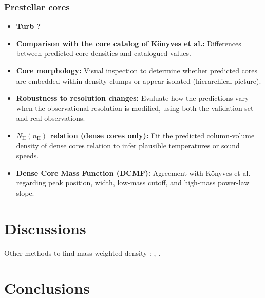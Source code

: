 \documentclass{aa}
\newcommand{\nh}{\ensuremath{n_\text{H}}}
\newcommand{\Nh}{\ensuremath{N_\text{H}}}
\begin{document}
   \subsubsection{Prestellar cores}

   
   

   \begin{itemize}
   \item \textbf{Turb ?}
   \item \textbf{Comparison with the core catalog of Könyves et al.:} Differences between predicted core densities and catalogued values.
   \item \textbf{Core morphology:} Visual inspection to determine whether predicted cores are embedded within density clumps or appear isolated (hierarchical picture).
   \item \textbf{Robustness to resolution changes: } Evaluate how the predictions vary when the observational resolution is modified, using both the validation set and real observations.
   \item \textbf{$\Nh(\nh)$ relation (dense cores only):} Fit the predicted column-volume density of dense cores relation to infer plausible temperatures or sound speeds.
   \item \textbf{Dense Core Mass Function (DCMF):} Agreement with Könyves et al. regarding peak position, width, low-mass cutoff, and high-mass power-law slope.
   \end{itemize}
\section{Discussions}
   Other methods to find mass-weighted density : \cite{gachesProbabilisticModelEstimate2024}, \cite{orkiszVolumeDensityStar2024}.
\section{Conclusions}



\end{document}
